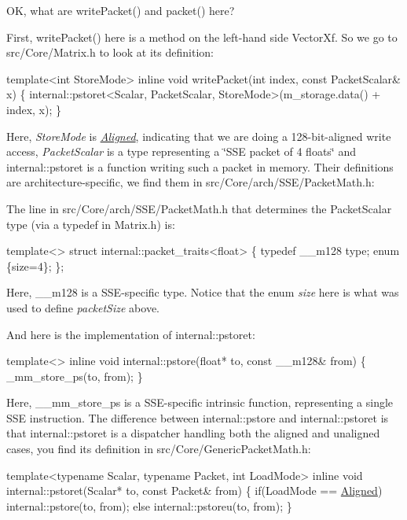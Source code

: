 OK, what are write\+Packet() and packet() here?

First, write\+Packet() here is a method on the left-\/hand side Vector\+Xf. So we go to src/\+Core/\+Matrix.\+h to look at its definition\+: 
\begin{DoxyCode}
\textcolor{keyword}{template}<\textcolor{keywordtype}{int} StoreMode>
\textcolor{keyword}{inline} \textcolor{keywordtype}{void} writePacket(\textcolor{keywordtype}{int} index, \textcolor{keyword}{const} PacketScalar& x)
\{
  internal::pstoret<Scalar, PacketScalar, StoreMode>(m\_storage.data() + index, x);
\}
\end{DoxyCode}
 Here, {\itshape Store\+Mode} is {\itshape \hyperlink{group__enums_gga45fe06e29902b7a2773de05ba27b47a1ad37d4c71425bb286e9b4103830538fbf}{Aligned}}, indicating that we are doing a 128-\/bit-\/aligned write access, {\itshape Packet\+Scalar} is a type representing a \char`\"{}\+S\+S\+E packet of 4 floats\char`\"{} and internal\+::pstoret is a function writing such a packet in memory. Their definitions are architecture-\/specific, we find them in src/\+Core/arch/\+S\+S\+E/\+Packet\+Math.\+h\+:

The line in src/\+Core/arch/\+S\+S\+E/\+Packet\+Math.\+h that determines the Packet\+Scalar type (via a typedef in Matrix.\+h) is\+: 
\begin{DoxyCode}
\textcolor{keyword}{template}<> \textcolor{keyword}{struct }internal::packet\_traits<float>  \{ \textcolor{keyword}{typedef} \_\_m128  type; \textcolor{keyword}{enum} \{size=4\}; \};
\end{DoxyCode}
 Here, \+\_\+\+\_\+m128 is a S\+S\+E-\/specific type. Notice that the enum {\itshape size} here is what was used to define {\itshape packet\+Size} above.

And here is the implementation of internal\+::pstoret\+: 
\begin{DoxyCode}
\textcolor{keyword}{template}<> \textcolor{keyword}{inline} \textcolor{keywordtype}{void} internal::pstore(\textcolor{keywordtype}{float}*  to, \textcolor{keyword}{const} \_\_m128&  from) \{ \_mm\_store\_ps(to, from); \}
\end{DoxyCode}
 Here, \+\_\+\+\_\+mm\+\_\+store\+\_\+ps is a S\+S\+E-\/specific intrinsic function, representing a single S\+SE instruction. The difference between internal\+::pstore and internal\+::pstoret is that internal\+::pstoret is a dispatcher handling both the aligned and unaligned cases, you find its definition in src/\+Core/\+Generic\+Packet\+Math.\+h\+: 
\begin{DoxyCode}
\textcolor{keyword}{template}<\textcolor{keyword}{typename} Scalar, \textcolor{keyword}{typename} Packet, \textcolor{keywordtype}{int} LoadMode>
\textcolor{keyword}{inline} \textcolor{keywordtype}{void} internal::pstoret(Scalar* to, \textcolor{keyword}{const} Packet& from)
\{
  \textcolor{keywordflow}{if}(LoadMode == \hyperlink{group__enums_gga45fe06e29902b7a2773de05ba27b47a1ad37d4c71425bb286e9b4103830538fbf}{Aligned})
    internal::pstore(to, from);
  \textcolor{keywordflow}{else}
    internal::pstoreu(to, from);
\}
\end{DoxyCode}


